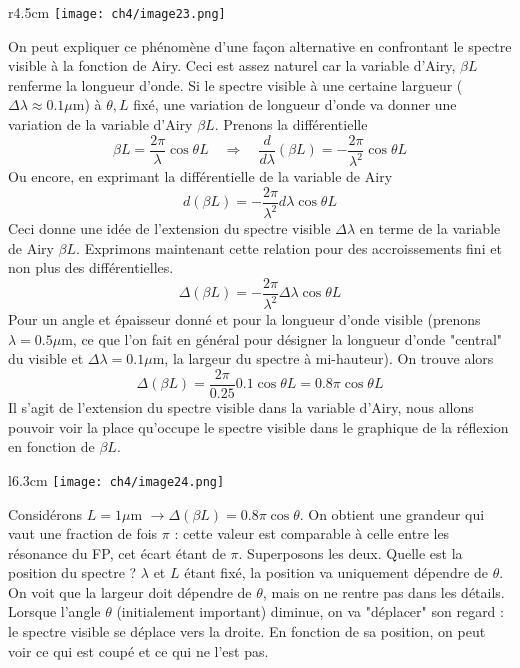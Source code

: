 	\begin{wrapfigure}[9]{r}{4.5cm}
	\vspace{-5mm}
	\texttt{[image: ch4/image23.png]}
	\end{wrapfigure}
On peut expliquer ce phénomène d'une façon alternative en confrontant le spectre visible à la 
fonction de Airy. Ceci est assez naturel car la variable d'Airy, $\beta L$ renferme la longueur 
d'onde. Si le spectre visible à une certaine largueur ($\Delta \lambda \approx 0.1\mu$m) à 
$\theta, L$ fixé, une variation de longueur d'onde va donner une variation de la variable d'Airy 
$\beta L$. Prenons la différentielle
\begin{equation}
\beta L = \frac{2\pi}{\lambda} \cos\theta L\quad\Rightarrow\quad \frac{d}{d\lambda}(\beta L) =
-\frac{2\pi}{\lambda^2}\cos\theta L
\end{equation}
Ou encore, en exprimant la différentielle de la variable de Airy
\begin{equation}
d(\beta L) = -\frac{2\pi}{\lambda^2}d\lambda\cos\theta L
\end{equation}
Ceci donne une idée de l'extension du spectre visible $\Delta \lambda$ en terme de la variable 
de Airy $\beta L$. Exprimons maintenant cette relation pour des accroissements fini et non plus 
des différentielles.
\begin{equation}
\Delta(\beta L) = -\frac{2\pi}{\lambda^2}\Delta\lambda\cos\theta L
\end{equation}
Pour un angle et épaisseur donné et pour la longueur d'onde visible (prenons $\lambda =0.5\mu$m, 
ce que l'on fait en général pour désigner la longueur d'onde "central" du visible et $\Delta\lambda=0.1 \mu$m, la largeur du spectre à mi-hauteur). On trouve alors
\begin{equation}
\Delta (\beta L) =\frac{2\pi}{0.25}0.1\cos\theta L = 0.8\pi\cos\theta L
\end{equation}
Il s'agit de l’extension du spectre visible dans la variable d'Airy, nous allons pouvoir voir 
la place qu'occupe le spectre visible dans le graphique de la réflexion en fonction de $\beta L$.\\

	\begin{wrapfigure}[11]{l}{6.3cm}
	\vspace{-5mm}
	\texttt{[image: ch4/image24.png]}
	\end{wrapfigure}
Considérons $L=1\mu$m $\rightarrow \Delta(\beta L) = 0.8\pi\cos\theta$. On obtient une grandeur 
qui vaut une fraction de fois $\pi$ : cette valeur est comparable à celle entre les résonance du FP, 
cet écart étant de $\pi$. Superposons les deux. Quelle est la position du spectre ? $\lambda$ et 
$L$ étant fixé, la position va uniquement dépendre de $\theta$.  On voit que la largeur doit dépendre 
de $\theta$, mais on ne rentre pas dans les détails. Lorsque l'angle $\theta$ (initialement important) 
diminue, on va "déplacer" son regard : le spectre visible se déplace vers la droite. En fonction de 
sa position, on peut voir ce qui est coupé et ce qui ne l'est pas.\\

